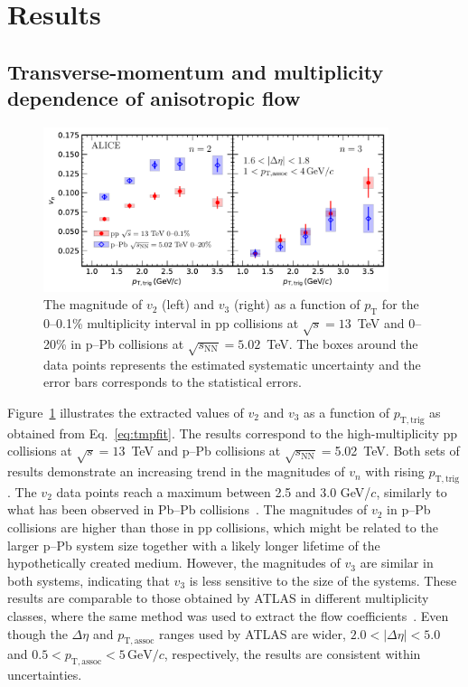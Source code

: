 
\section {Results}
\label{sec:results}
\subsection{Transverse-momentum and multiplicity dependence of anisotropic flow}

\begin{figure}[!b]
	\centering
	\hspace{-3em}\includegraphics[width=0.9\textwidth]{figures/FIG4_vn_pppPb.pdf} %
	\caption{The magnitude of $v_2$ (left) and $v_3$ (right) as a function of $p_\mathrm{T}$ for the 0--0.1\% multiplicity interval in pp collisions at $\sqrt{s}=13$~TeV and 0--20\% in p--Pb collisions at $\sqrt{s_\mathrm{NN}} = 5.02$~TeV. The boxes around the data points represents the estimated systematic uncertainty and the error bars corresponds to the statistical errors.}
	\label{fig:vn}
\end{figure}
Figure~\ref{fig:vn} illustrates the extracted values of $v_2$ and $v_3$ as a function of $p_{\mathrm{T,trig}}$ as obtained from Eq.~\eqref{eq:tmpfit}. The results correspond to the high-multiplicity pp collisions at $\sqrt{s}=13$~TeV and p--Pb collisions at $\sqrt{s_\mathrm{NN}}=$5.02~TeV. Both sets of results demonstrate an increasing trend in the magnitudes of $v_n$ with rising $p_{\mathrm{T,trig}}$. The $v_2$ data points reach a maximum between 2.5 and 3.0 GeV/$c$, similarly to what has been observed in Pb--Pb collisions~\cite{Abelev:2012di, ALICE:2018yph}.
The magnitudes of $v_2$ in p--Pb collisions are higher than those in pp collisions, which might be related to the larger p--Pb system size together with a likely longer lifetime of the hypothetically created medium.
However, the magnitudes of $v_3$ are similar in both systems, indicating that $v_3$ is less sensitive to the size of the systems.
These results are comparable to those obtained by ATLAS in different multiplicity classes, where the same method was used to extract the flow coefficients~\cite{ATLAS:2016yzd}. Even though the $\Delta\eta$ and $p_{\mathrm{T,assoc}}$ ranges used by ATLAS are wider, $2.0<|\Delta\eta|<5.0$ and $0.5<p_{\mathrm{T,assoc}}<5\,\mathrm{GeV}/c$, respectively, the results are consistent within uncertainties.

